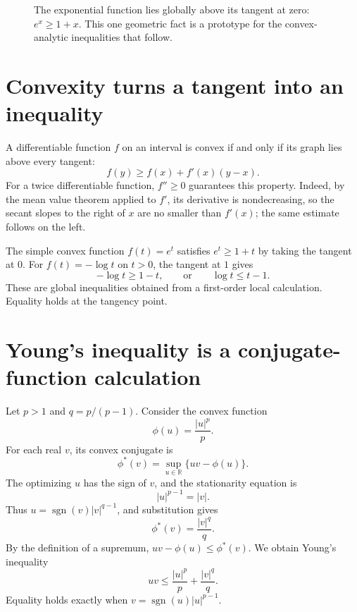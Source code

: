 \begin{figure}[H]
\centering
{}
\caption{The exponential function lies globally above its tangent at zero: $e^x\ge1+x$. This one geometric fact is a prototype for the convex-analytic inequalities that follow.}
\end{figure}

\section{Convexity turns a tangent into an inequality}

A differentiable function \(f\) on an interval is convex if and only if its graph lies above every tangent:
\[
 \boxed{f(y)\ge f(x)+f'(x)(y-x).}
\]
For a twice differentiable function, \(f''\ge0\) guarantees this property. Indeed, by the mean value theorem applied to \(f'\), its derivative is nondecreasing, so the secant slopes to the right of \(x\) are no smaller than \(f'(x)\); the same estimate follows on the left.

The simple convex function \(f(t)=e^t\) satisfies \(e^t\ge1+t\) by taking the tangent at \(0\). For \(f(t)=-\log t\) on \(t>0\), the tangent at \(1\) gives
\[
 -\log t\ge1-t,\qquad\text{or}\qquad \log t\le t-1.
\]
These are global inequalities obtained from a first-order local calculation. Equality holds at the tangency point.

\section{Young's inequality is a conjugate-function calculation}

Let \(p>1\) and \(q=p/(p-1)\). Consider the convex function
\[
 \phi(u)=\frac{|u|^p}{p}.
\]
For each real \(v\), its convex conjugate is
\[
 \phi^*(v)=\sup_{u\in\mathbb R}\{uv-\phi(u)\}.
\]
The optimizing \(u\) has the sign of \(v\), and the stationarity equation is
\[
 |u|^{p-1}=|v|.
\]
Thus \(u=\operatorname{sgn}(v)|v|^{q-1}\), and substitution gives
\[
 \boxed{\phi^*(v)=\frac{|v|^q}{q}.}
\]
By the definition of a supremum, \(uv-\phi(u)\le\phi^*(v)\). We obtain Young's inequality
\[
 \boxed{uv\le\frac{|u|^p}{p}+\frac{|v|^q}{q}.}
\]
Equality holds exactly when \(v=\operatorname{sgn}(u)|u|^{p-1}\).

